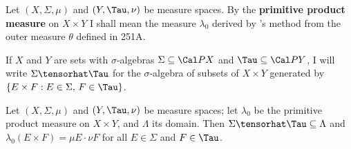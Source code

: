  Let $(X,\Sigma,\mu)$ and $(Y,\Tau,\nu)$ be
measure spaces.   By the {\bf primitive product measure} on $X\times Y$
I shall mean the measure $\lambda_0$ derived by \Caratheodory's
method from the outer measure $\theta$ defined in 251A.


   If $X$ and $Y$ are sets
with $\sigma$-algebras $\Sigma\subseteq\Cal PX$ and
$\Tau\subseteq\Cal PY$, I will write $\Sigma\tensorhat\Tau$ for the
$\sigma$-algebra of subsets of $X\times Y$ generated by
$\{E\times F:E\in\Sigma,\,F\in\Tau\}$.


 Let $(X,\Sigma,\mu)$ and $(Y,\Tau,\nu)$ be
measure spaces;  let $\lambda_0$  be the primitive product measure on
$X\times Y$, and $\Lambda$ its domain.
Then $\Sigma\tensorhat\Tau\subseteq\Lambda$  and
$\lambda_0(E\times F)=\mu E\cdot\nu F$ for all $E\in\Sigma$
and $F\in\Tau$.

